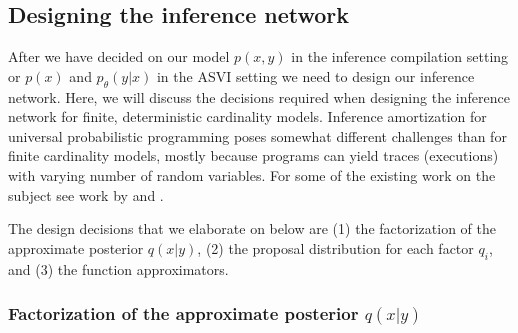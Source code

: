 \documentclass[12pt]{article}
\begin{document}
\subsection{Designing the inference network}
\label{sec:design}

After we have decided on our model $p(x,y)$ in the inference compilation setting or $p(x)$ and $p_\theta(y|x)$ in the ASVI setting we need to design our inference network. 
Here, we will discuss the decisions required when designing the inference network for finite, deterministic cardinality models.
Inference amortization for universal probabilistic programming poses somewhat different challenges than for finite cardinality models, mostly because programs can yield traces (executions) with varying number of random variables.
For some of the existing work on the subject see work by \citet{RitchieEtAl2016} and \citet{LeEtAl2016}.

The design decisions that we elaborate on below are
(1) the factorization of the approximate posterior $q(x|y)$, 
(2) the proposal distribution for each factor $q_i$, and
(3) the function approximators.


\subsubsection*{Factorization of the approximate posterior $q(x|y)$}
\end{document}
